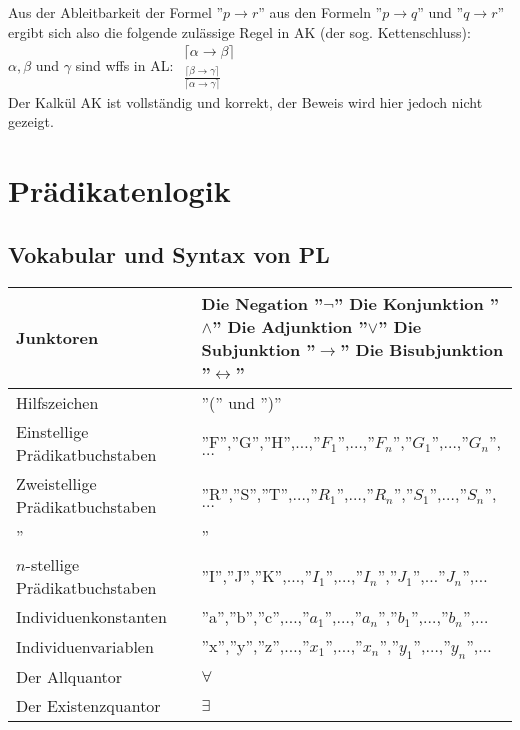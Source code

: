\documentclass{scrartcl}
\begin{document}
Aus der Ableitbarkeit der Formel ''$ p \rightarrow r $'' aus den Formeln ''$ p \rightarrow q $'' und ''$ q \rightarrow r $'' ergibt sich also die folgende zulässige Regel in AK (der sog. Kettenschluss): \\

$ \alpha,\beta $ und $ \gamma $ sind wffs in AL:
\Huge
$ \substack{\lceil \alpha \rightarrow \beta \rceil \\ \frac{\lceil \beta \rightarrow \gamma \rceil}{\lceil \alpha \rightarrow \gamma \rceil}} $ \\

\normalsize
Der Kalkül AK ist vollständig und korrekt, der Beweis wird hier jedoch nicht gezeigt.

\section{Prädikatenlogik}

\subsection{Vokabular und Syntax von PL}

\begin{tabularx}{\linewidth}{l|X}
	Junktoren &	Die Negation ''$ \neg $'' \newline 
				Die Konjunktion ''$ \wedge $'' \newline
				Die Adjunktion ''$ \vee $'' \newline
				Die Subjunktion ''$ \rightarrow $'' \newline
				Die Bisubjunktion ''$ \leftrightarrow $'' \\
	\hline
	Hilfszeichen & ''('' und '')'' \\
	\hline
	Einstellige Prädikatbuchstaben & ''F'',''G'',''H'',$ \ldots $,''$ F_1 $'',$ \ldots $,''$ F_n $'',''$ G_1 $'',$ \ldots $,''$ G_n $'',$ \ldots $ \\
	\hline
	Zweistellige Prädikatbuchstaben & ''R'',''S'',''T'',$ \ldots $,''$ R_1 $'',$ \ldots $,''$ R_n $'',''$ S_1 $'',$ \ldots $,''$ S_n $'',$ \ldots $ \\
	\hline
	'' & '' \\
	\hline
	$ n $-stellige Prädikatbuchstaben & ''I'',''J'',''K'',$ \ldots $,''$ I_1 $'',$ \ldots $,''$ I_n $'',''$ J_1 $'',$ \ldots $''$ J_n $'',$ \ldots $ \\
	\hline
	Individuenkonstanten & ''a'',''b'',''c'',$ \ldots $,''$ a_1 $'',$ \ldots $,''$ a_n $'',''$ b_1 $'',$ \ldots $,''$ b_n $'',$ \ldots $ \\
	\hline
	Individuenvariablen & ''x'',''y'',''z'',$ \ldots $,''$ x_1 $'',$ \ldots $,''$ x_n $'',''$ y_1 $'',$ \ldots $,''$ y_n $'',$ \ldots $ \\
	\hline
	Der Allquantor & $ \forall $ \\
	\hline
	Der Existenzquantor & $ \exists $
\end{tabularx}
\end{document}
